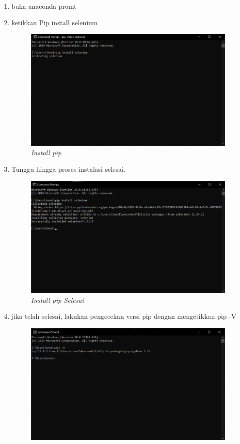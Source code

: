 \begin{enumerate}
\item buka anaconda promt
\item ketikkan Pip install selenium
\begin{figure}[H]
    \centering
    \includegraphics[scale=0.3]{figures/installpip (2)}
    \caption{\textit{Install pip}}
    \label{Figureanaconda70}
\end{figure}
\item Tunggu hingga proses instalasi selesai.
\begin{figure}[H]
    \centering
    \includegraphics[scale=0.3]{figures/pipselesai (2)}
    \caption{\textit{Install pip Selesai}}
    \label{Figureanaconda70}
\end{figure}
\item jika telah selesai, lakukan pengecekan versi pip dengan mengetikkan pip -V
\begin{figure}[H]
    \centering
    \includegraphics[scale=0.5]{figures/pipversion (2)}

\end{figure}
\end{enumerate}
